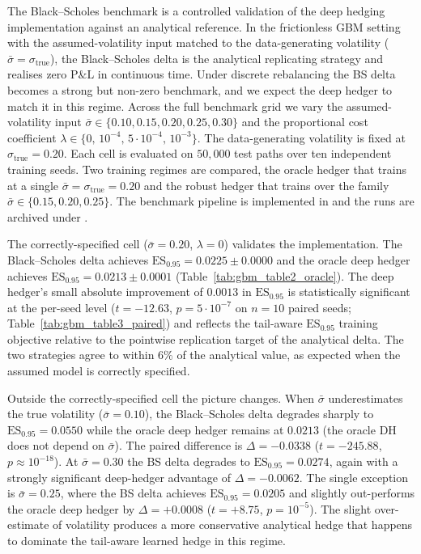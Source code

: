 \documentclass[12pt,a4paper]{article}
\theoremstyle{definition}
\theoremstyle{plain}
\theoremstyle{remark}
\theoremstyle{plain}
\begin{document}
The Black--Scholes benchmark is a controlled validation of the
deep hedging implementation against an analytical reference. In the
frictionless GBM setting with the assumed-volatility input matched
to the data-generating volatility ($\bar\sigma = \sigma_{\mathrm{true}}$),
the Black--Scholes delta is the analytical replicating strategy and
realises zero $\mathrm{P\&L}$ in continuous time. Under discrete
rebalancing the BS delta becomes a strong but non-zero benchmark, and
we expect the deep hedger to match it in this regime. Across the full
benchmark grid we vary the assumed-volatility input
$\bar\sigma \in \{0.10, 0.15, 0.20, 0.25, 0.30\}$ and the proportional
cost coefficient $\lambda \in \{0,\, 10^{-4},\, 5{\cdot}10^{-4},\,
10^{-3}\}$. The data-generating volatility is fixed at
$\sigma_{\mathrm{true}} = 0.20$. Each cell is evaluated on $50{,}000$
test paths over ten independent training seeds. Two training regimes
are compared, the oracle hedger that trains at a single
$\bar\sigma = \sigma_{\mathrm{true}} = 0.20$ and the robust hedger that
trains over the family $\bar\sigma \in \{0.15, 0.20, 0.25\}$. The
benchmark pipeline is implemented in  and the
runs are archived under .

The correctly-specified cell ($\bar\sigma = 0.20$, $\lambda = 0$)
validates the implementation. The Black--Scholes delta achieves
$\mathrm{ES}_{0.95} = 0.0225 \pm 0.0000$ and the oracle deep hedger
achieves $\mathrm{ES}_{0.95} = 0.0213 \pm 0.0001$
(Table~\ref{tab:gbm_table2_oracle}). The deep hedger's small
absolute improvement of $0.0013$ in $\mathrm{ES}_{0.95}$ is statistically
significant at the per-seed level ($t = -12.63$, $p = 5{\cdot}10^{-7}$
on $n = 10$ paired seeds; Table~\ref{tab:gbm_table3_paired}) and
reflects the tail-aware $\mathrm{ES}_{0.95}$ training objective
relative to the pointwise replication target of the analytical delta.
The two strategies agree to within $6\%$ of the analytical value, as
expected when the assumed model is correctly specified.

Outside the correctly-specified cell the picture changes. When
$\bar\sigma$ underestimates the true volatility ($\bar\sigma = 0.10$),
the Black--Scholes delta degrades sharply to $\mathrm{ES}_{0.95} = 0.0550$
while the oracle deep hedger remains at $0.0213$ (the oracle DH does
not depend on $\bar\sigma$). The paired difference is $\Delta = -0.0338$
($t = -245.88$, $p \approx 10^{-18}$). At $\bar\sigma = 0.30$ the BS
delta degrades to $\mathrm{ES}_{0.95} = 0.0274$, again with a strongly
significant deep-hedger advantage of $\Delta = -0.0062$. The single
exception is $\bar\sigma = 0.25$, where the BS delta achieves
$\mathrm{ES}_{0.95} = 0.0205$ and slightly out-performs the oracle deep
hedger by $\Delta = +0.0008$ ($t = +8.75$, $p = 10^{-5}$). The slight
over-estimate of volatility produces a more conservative analytical
hedge that happens to dominate the tail-aware learned hedge in this
regime.
\end{document}
